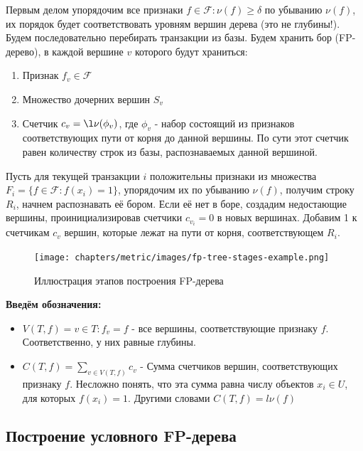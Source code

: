 Первым делом упорядочим все признаки $f \in \mathcal{F}: \nu(f) \geq \delta$ по убыванию $\nu(f)$, их порядок будет соответствовать уровням вершин дерева (это не глубины!). Будем последовательно перебирать транзакции из базы. Будем хранить бор (FP-дерево), в каждой вершине $v$ которого будут храниться: 
\begin{enumerate}
    \item Признак $f_v \in \mathcal{F}$
    \item Множество дочерних вершин $S_v$
    \item Счетчик $c_v = \l\nu(\phi_v)$, где $\phi_v$ - набор состоящий из признаков соответствующих пути от корня до данной вершины. По сути этот счетчик равен количеству строк из базы, распознаваемых данной вершиной.
\end{enumerate}

Пусть для текущей транзакции $i$ положительны признаки из множества $F_i = \{f \in \mathcal{F}: f(x_i) = 1 \}$, упорядочим их по убыванию $\nu(f)$, получим строку $R_i$, начнем распознавать её бором. Если её нет в боре, создадим недостающие вершины, проинициализировав счетчики $c_{v_i} = 0$ в новых вершинах. Добавим 1 к счетчикам $c_v$ вершин, которые лежат на пути от корня, соответствующем $R_i$.

\begin{figure}[h]
    \centering
    \texttt{[image: chapters/metric/images/fp-tree-stages-example.png]}
    \caption{Иллюстрация этапов построения FP-дерева}
    \label{fig:enter-label}
\end{figure}

\textbf{Введём обозначения:}

\begin{itemize}
    \item $V(T, f) = {v \in T: f_v = f}$ - все вершины, соответствующие признаку $f$. Соответственно, у них равные глубины.
    \item $C(T, f) = \displaystyle\sum_{v \in V(T, f)} c_v$ - Сумма счетчиков вершин, соответствующих признаку $f$. Несложно понять, что эта сумма равна числу объектов $x_i \in U$, для которых $f(x_i) = 1$. Другими словами $C(T, f) = l\nu(f)$
\end{itemize}


\subsection{Построение условного FP-дерева}

